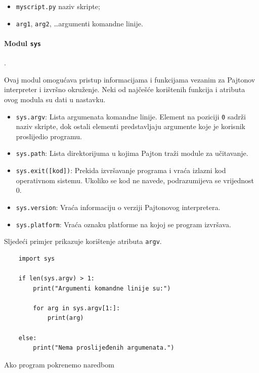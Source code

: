 \begin{itemize}
	\item \texttt{myscript.py} naziv skripte;
	\item \texttt{arg1}, \texttt{arg2}, \ldots argumenti komandne linije.
\end{itemize}

\paragraph{Modul \texttt{sys}}. 

Ovaj modul omogućava pristup informacijama i funkcijama vezanim za Pajtonov interpreter i izvršno okruženje. Neki od najčešće korištenih funkcija i atributa ovog modula su dati u nastavku.

\begin{itemize}
	
	\item \texttt{sys.argv}:  Lista argumenata komandne linije. Element na poziciji \texttt{0} sadrži naziv skripte, dok ostali elementi predstavljaju argumente koje je korisnik proslijedio programu.
	
	\item \texttt{sys.path}: Lista direktorijuma u kojima Pajton traži module za učitavanje.
	
	\item \texttt{sys.exit([kod])}:  Prekida izvršavanje programa i vraća izlazni kod operativnom sistemu. Ukoliko se kod ne navede, podrazumijeva se vrijednost 0.
	
	\item \texttt{sys.version}: Vraća informaciju o verziji Pajtonovog interpretera.
	
	\item \texttt{sys.platform}: Vraća oznaku platforme na kojoj se program izvršava.
	
\end{itemize}

Sljedeći primjer prikazuje korištenje atributa \texttt{argv}.

\begin{verbatim}
	import sys
	
	if len(sys.argv) > 1:
	    print("Argumenti komandne linije su:")
	
	    for arg in sys.argv[1:]:
	        print(arg)
	 
	else:
	    print("Nema proslijeđenih argumenata.")
\end{verbatim}

Ako program pokrenemo naredbom

